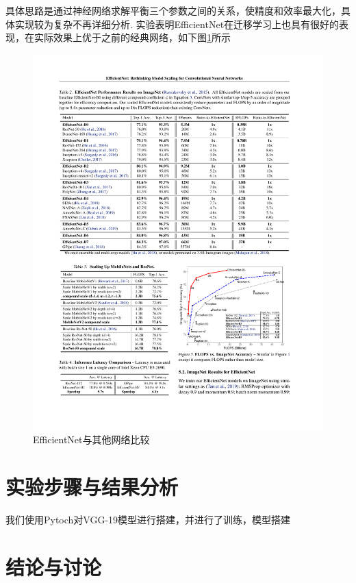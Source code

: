 \documentclass[12pt, a4paper, oneside]{ctexart}
\numberwithin{equation}{section}  %
\begin{document}
具体思路是通过神经网络求解平衡三个参数之间的关系，使精度和效率最大化，具体实现较为复杂不再详细分析. 实验表明EfficientNet在迁移学习上也具有很好的表现，在实际效果上优于之前的经典网络，如下图\ref{fig-compare}所示
\begin{figure}[htbp]
  \hspace*{-2cm}
  \centering
  \includegraphics[scale=1.15]{EfficientNet.pdf}
  \caption{EfficientNet与其他网络比较}
  \label{fig-compare}
\end{figure}

\section{实验步骤与结果分析}
我们使用Pytoch对VGG-19模型进行搭建，并进行了训练，模型搭建
\section{结论与讨论}
\end{document}
